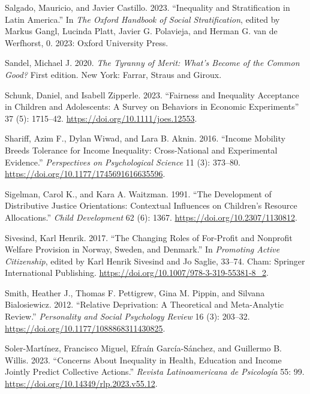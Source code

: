 \documentclass[
  letterpaper,
  DIV=11,
  numbers=noendperiod]{scrartcl}
\newlength{\cslhangindent}
\newenvironment{CSLReferences}[2] %
 {\begin{list}{}{%
  \setlength{\itemindent}{0pt}
  \setlength{\leftmargin}{0pt}
  \setlength{\parsep}{0pt}
  \ifodd #1
   \setlength{\leftmargin}{\cslhangindent}
   \setlength{\itemindent}{-1\cslhangindent}
  \fi
  \setlength{\itemsep}{#2\baselineskip}}}
 {\end{list}}
\begin{document}
\begin{CSLReferences}{1}{0}
Salgado, Mauricio, and Javier Castillo. 2023. {``Inequality and
{Stratification} in {Latin America}.''} In \emph{The {Oxford Handbook}
of {Social Stratification}}, edited by Markus Gangl, Lucinda Platt,
Javier G. Polavieja, and Herman G. van de Werfhorst, 0. 2023: Oxford
University Press.

Sandel, Michael J. 2020. \emph{The Tyranny of Merit: {What}'s Become of
the Common Good?} First edition. New York: {Farrar, Straus and Giroux}.

Schunk, Daniel, and Isabell Zipperle. 2023. {``Fairness and Inequality
Acceptance in Children and Adolescents: {A} Survey on Behaviors in
Economic Experiments''} 37 (5): 1715--42.
\url{https://doi.org/10.1111/joes.12553}.

Shariff, Azim F., Dylan Wiwad, and Lara B. Aknin. 2016. {``Income
{Mobility Breeds Tolerance} for {Income Inequality}: {Cross-National}
and {Experimental Evidence}.''} \emph{Perspectives on Psychological
Science} 11 (3): 373--80.
\url{https://doi.org/10.1177/1745691616635596}.

Sigelman, Carol K., and Kara A. Waitzman. 1991. {``The {Development} of
{Distributive Justice Orientations}: {Contextual Influences} on
{Children}'s {Resource Allocations}.''} \emph{Child Development} 62 (6):
1367. \url{https://doi.org/10.2307/1130812}.

Sivesind, Karl Henrik. 2017. {``The {Changing Roles} of {For-Profit} and
{Nonprofit Welfare Provision} in {Norway}, {Sweden}, and {Denmark}.''}
In \emph{Promoting {Active Citizenship}}, edited by Karl Henrik Sivesind
and Jo Saglie, 33--74. Cham: Springer International Publishing.
\url{https://doi.org/10.1007/978-3-319-55381-8_2}.

Smith, Heather J., Thomas F. Pettigrew, Gina M. Pippin, and Silvana
Bialosiewicz. 2012. {``Relative {Deprivation}: {A Theoretical} and
{Meta-Analytic Review}.''} \emph{Personality and Social Psychology
Review} 16 (3): 203--32. \url{https://doi.org/10.1177/1088868311430825}.

Soler-Martínez, Francisco Miguel, Efraín García-Sánchez, and Guillermo
B. Willis. 2023. {``Concerns {About Inequality} in {Health}, {Education}
and {Income Jointly Predict Collective Actions}.''} \emph{Revista
Latinoamericana de Psicolog{í}a} 55: 99.
\url{https://doi.org/10.14349/rlp.2023.v55.12}.


\end{CSLReferences}
\end{document}
